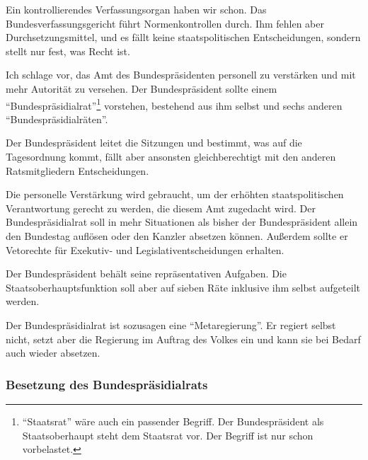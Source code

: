 Ein kontrollierendes Verfassungsorgan haben wir schon.
Das Bundesverfassungsgericht führt Normenkontrollen durch.
Ihm fehlen aber Durchsetzungsmittel, und es fällt keine staatspolitischen Entscheidungen, sondern stellt nur fest, was Recht ist.

Ich schlage vor, das Amt des Bundespräsidenten personell zu verstärken und mit mehr Autorität zu versehen.
Der Bundespräsident sollte einem \enquote{Bundespräsidialrat}\footnote{\enquote{Staatsrat} wäre auch ein passender Begriff. Der Bundespräsident als Staatsoberhaupt steht dem Staatsrat vor.
Der Begriff ist nur schon vorbelastet.} vorstehen,
bestehend aus ihm selbst und sechs anderen \enquote{Bundespräsidialräten}.

Der Bundespräsident leitet die Sitzungen und bestimmt, was auf die Tagesordnung kommt, fällt aber ansonsten gleichberechtigt mit den anderen Ratsmitgliedern Entscheidungen.

Die personelle Verstärkung wird gebraucht, um der erhöhten staatspolitischen Verantwortung gerecht zu werden, die diesem Amt zugedacht wird.
Der Bundespräsidialrat soll in mehr Situationen als bisher der Bundespräsident allein den Bundestag auflösen oder den Kanzler absetzen können.
Außerdem sollte er Vetorechte für Exekutiv- und Legislativentscheidungen erhalten.

Der Bundespräsident behält seine repräsentativen Aufgaben.
Die Staatsoberhauptsfunktion soll aber auf sieben Räte inklusive ihm selbst aufgeteilt werden.

Der Bundespräsidialrat ist sozusagen eine \enquote{Metaregierung}.
Er regiert selbst nicht, setzt aber die Regierung im Auftrag des Volkes ein und kann sie bei Bedarf auch wieder absetzen.

\subsubsection{Besetzung des Bundespräsidialrats} \label{subsubsec:besetzung_bundespraesidialrat}

